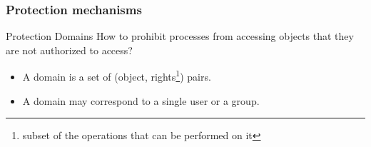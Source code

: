     \begin{frame}
        \frametitle{Protection mechanisms}
        \begin{block}{Protection Domains}
          How to prohibit processes from accessing objects that they are not authorized to access?
          \begin{itemize}
            \item A domain is a set of (object, rights\footnote{subset of the operations that can be performed on it}) pairs.
            \item A domain may correspond to a single user or a group.
          \end{itemize}
        \end{block}
    \end{frame}
